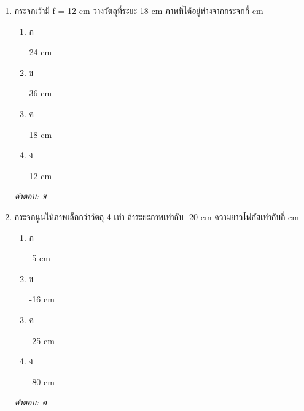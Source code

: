 \documentclass[12pt]{article}
\begin{document}
\begin{enumerate}[label=\arabic*., itemsep=0.5\baselineskip, topsep=0.5\baselineskip, leftmargin=*]
\item กระจกเว้ามี f = 12 cm วางวัตถุที่ระยะ 18 cm ภาพที่ได้อยู่ห่างจากกระจกกี่ cm
\begin{enumerate}[label=\alph*)., itemsep=0.3\baselineskip, topsep=0.3\baselineskip]
\item ก\ 
\begin{minipage}[t]{0.9\linewidth}
\raggedright 24 cm
\end{minipage}
\item ข\ 
\begin{minipage}[t]{0.9\linewidth}
\raggedright 36 cm
\end{minipage}
\item ค\ 
\begin{minipage}[t]{0.9\linewidth}
\raggedright 18 cm
\end{minipage}
\item ง\ 
\begin{minipage}[t]{0.9\linewidth}
\raggedright 12 cm
\end{minipage}
\end{enumerate}
\vspace{-0.3\baselineskip}
\begin{small}
\textit{คำตอบ: ข}
\end{small}

\item กระจกนูนให้ภาพเล็กกว่าวัตถุ 4 เท่า ถ้าระยะภาพเท่ากับ -20 cm ความยาวโฟกัสเท่ากับกี่ cm
\begin{enumerate}[label=\alph*)., itemsep=0.3\baselineskip, topsep=0.3\baselineskip]
\item ก\ 
\begin{minipage}[t]{0.9\linewidth}
\raggedright -5 cm
\end{minipage}
\item ข\ 
\begin{minipage}[t]{0.9\linewidth}
\raggedright -16 cm
\end{minipage}
\item ค\ 
\begin{minipage}[t]{0.9\linewidth}
\raggedright -25 cm
\end{minipage}
\item ง\ 
\begin{minipage}[t]{0.9\linewidth}
\raggedright -80 cm
\end{minipage}
\end{enumerate}
\vspace{-0.3\baselineskip}
\begin{small}
\textit{คำตอบ: ค}
\end{small}


\end{enumerate}
\end{document}
